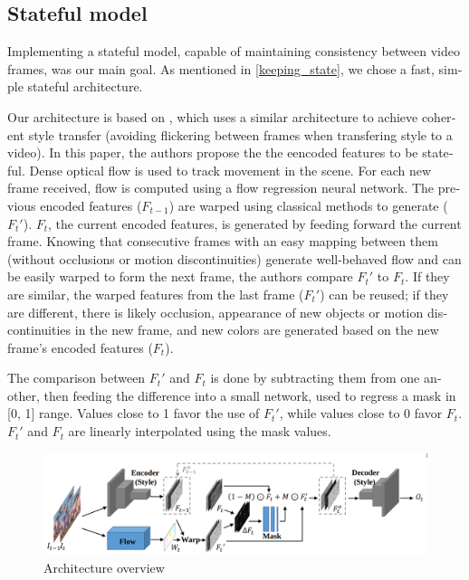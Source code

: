 \documentclass[12pt,openright,twoside,a4paper,english]{abntex2}
\begin{document}
\begin{otherlanguage}{english}
\subsection{Stateful model}

Implementing a stateful model, capable of maintaining consistency between video frames, was our main goal. As mentioned in \ref{keeping_state}, we chose a fast, simple stateful architecture.

Our architecture is based on , %
which uses a similar architecture to achieve coherent style transfer (avoiding flickering between frames when transfering style to a video). In this paper, the authors propose the the eencoded features to be stateful. Dense optical flow is used to track movement in the scene. For each new frame received, flow is computed using a flow regression neural network. The previous encoded features ($F_{t-1}$) are warped using classical methods to generate ($F_t'$). $F_t$, the current encoded features, is generated by feeding forward the current frame. Knowing that consecutive frames with an easy mapping between them (without occlusions or motion discontinuities) generate well-behaved flow and can be easily warped to form the next frame, the authors compare $F_t'$ to $F_t$. If they are similar, the warped features from the last frame ($F_t'$) can be reused; if they are different, there is likely occlusion, appearance of new objects or motion discontinuities in the new frame, and new colors are generated based on the new frame's encoded features ($F_t$).

The comparison between $F_t'$ and $F_t$ is done by subtracting them from one another, then feeding the difference into a small network, used to regress a mask in [0, 1] range. Values close to 1 favor the use of $F_t'$, while values close to 0 favor $F_t$. $F_t'$ and $F_t$ are linearly interpolated using the mask values.

\begin{figure}[!htb]
\centering
\includegraphics[width=\textwidth]{optical_flow_arch}
\caption{Architecture overview}
\label{optical_flow_arch}
\end{figure}


\end{otherlanguage}
\end{document}

